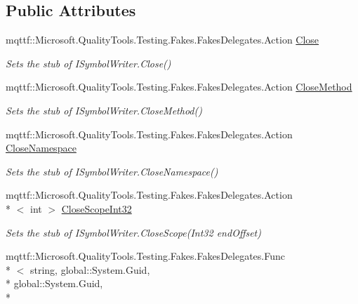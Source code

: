 \subsection*{Public Attributes}
\begin{DoxyCompactItemize}
\item 
mqttf\-::\-Microsoft.\-Quality\-Tools.\-Testing.\-Fakes.\-Fakes\-Delegates.\-Action \hyperlink{class_system_1_1_diagnostics_1_1_symbol_store_1_1_fakes_1_1_stub_i_symbol_writer_acb6c710e1781f880682935f5563c0ac6}{Close}
\begin{DoxyCompactList}\small\item\em Sets the stub of I\-Symbol\-Writer.\-Close()\end{DoxyCompactList}\item 
mqttf\-::\-Microsoft.\-Quality\-Tools.\-Testing.\-Fakes.\-Fakes\-Delegates.\-Action \hyperlink{class_system_1_1_diagnostics_1_1_symbol_store_1_1_fakes_1_1_stub_i_symbol_writer_a13ef201625f316f09a8e5c2f93541c75}{Close\-Method}
\begin{DoxyCompactList}\small\item\em Sets the stub of I\-Symbol\-Writer.\-Close\-Method()\end{DoxyCompactList}\item 
mqttf\-::\-Microsoft.\-Quality\-Tools.\-Testing.\-Fakes.\-Fakes\-Delegates.\-Action \hyperlink{class_system_1_1_diagnostics_1_1_symbol_store_1_1_fakes_1_1_stub_i_symbol_writer_aec74b3dec29a66cf1c1611c1d6c8493f}{Close\-Namespace}
\begin{DoxyCompactList}\small\item\em Sets the stub of I\-Symbol\-Writer.\-Close\-Namespace()\end{DoxyCompactList}\item 
mqttf\-::\-Microsoft.\-Quality\-Tools.\-Testing.\-Fakes.\-Fakes\-Delegates.\-Action\\*
$<$ int $>$ \hyperlink{class_system_1_1_diagnostics_1_1_symbol_store_1_1_fakes_1_1_stub_i_symbol_writer_af1d7a69b80392211effad3a6342a8199}{Close\-Scope\-Int32}
\begin{DoxyCompactList}\small\item\em Sets the stub of I\-Symbol\-Writer.\-Close\-Scope(\-Int32 end\-Offset)\end{DoxyCompactList}\item 
mqttf\-::\-Microsoft.\-Quality\-Tools.\-Testing.\-Fakes.\-Fakes\-Delegates.\-Func\\*
$<$ string, global\-::\-System.\-Guid, \\*
global\-::\-System.\-Guid, \\*

\end{DoxyCompactItemize}
